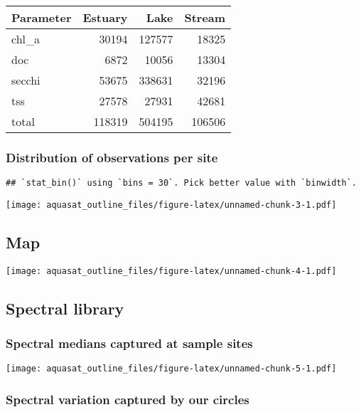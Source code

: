 \documentclass[]{article}
\begin{document}
\begin{longtable}[]{@{}lrrr@{}}
\toprule
Parameter & Estuary & Lake & Stream\tabularnewline
\midrule
\endhead
chl\_a & 30194 & 127577 & 18325\tabularnewline
doc & 6872 & 10056 & 13304\tabularnewline
secchi & 53675 & 338631 & 32196\tabularnewline
tss & 27578 & 27931 & 42681\tabularnewline
total & 118319 & 504195 & 106506\tabularnewline
\bottomrule
\end{longtable}

\hypertarget{distribution-of-observations-per-site}{%
\subsubsection{Distribution of observations per
site}\label{distribution-of-observations-per-site}}

\begin{verbatim}
## `stat_bin()` using `bins = 30`. Pick better value with `binwidth`.
\end{verbatim}

\texttt{[image: aquasat\_outline\_files/figure-latex/unnamed-chunk-3-1.pdf]}

\hypertarget{map}{%
\subsection{Map}\label{map}}

\texttt{[image: aquasat\_outline\_files/figure-latex/unnamed-chunk-4-1.pdf]}

\hypertarget{spectral-library}{%
\subsection{Spectral library}\label{spectral-library}}

\hypertarget{spectral-medians-captured-at-sample-sites}{%
\subsubsection{Spectral medians captured at sample
sites}\label{spectral-medians-captured-at-sample-sites}}

\texttt{[image: aquasat\_outline\_files/figure-latex/unnamed-chunk-5-1.pdf]}

\hypertarget{spectral-variation-captured-by-our-circles}{%
\subsubsection{Spectral variation captured by our
circles}\label{spectral-variation-captured-by-our-circles}}
\end{document}
